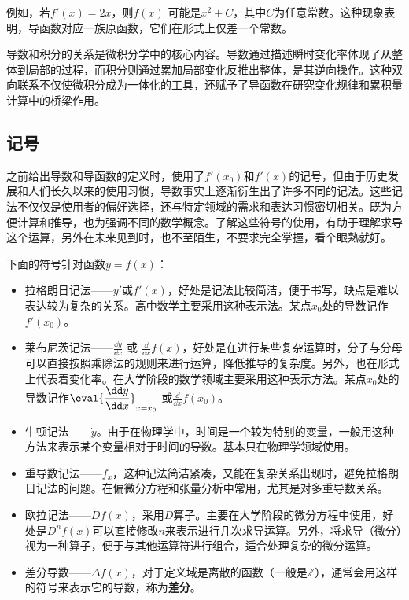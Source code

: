 例如，若$f'(x) = 2x$，则$f(x)$ 可能是$x^2 + C$，其中$C$为任意常数。这种现象表明，导函数对应一族原函数，它们在形式上仅差一个常数。

导数和积分的关系是微积分学中的核心内容。导数通过描述瞬时变化率体现了从整体到局部的过程，而积分则通过累加局部变化反推出整体，是其逆向操作。这种双向联系不仅使微积分成为一体化的工具，还赋予了导函数在研究变化规律和累积量计算中的桥梁作用。

\subsection{记号}

之前给出导数和导函数的定义时，使用了$f'(x_0)$和$f'(x)$的记号，但由于历史发展和人们长久以来的使用习惯，导数事实上逐渐衍生出了许多不同的记法。这些记法不仅仅是使用者的偏好选择，还与特定领域的需求和表达习惯密切相关。既为方便计算和推导，也为强调不同的数学概念。了解这些符号的使用，有助于理解求导这个运算，另外在未来见到时，也不至陌生，不要求完全掌握，看个眼熟就好。

下面的符号针对函数$y=f(x)$：
\begin{itemize}
\item 拉格朗日记法——$y'$或$f'(x)$，好处是记法比较简洁，便于书写，缺点是难以表达较为复杂的关系。高中数学主要采用这种表示法。某点$x_0$处的导数记作$f'(x_0)$。
\item 莱布尼茨记法——$\displaystyle\frac{\dd y}{\dd x}$  或  $\displaystyle\frac{\dd}{\dd x}f(x)$，好处是在进行某些复杂运算时，分子与分母可以直接按照乘除法的规则来进行运算，降低推导的复杂度。另外，也在形式上代表着变化率。在大学阶段的数学领域主要采用这种表示方法。某点$x_0$处的导数记作$\displaystyle\eval{\dfrac{\dd y}{\dd x}}_{x=x_0}$ 或$\displaystyle\frac{\dd}{\dd x}f(x_0)$。
\item 牛顿记法——$\dot{y}$。由于在物理学中，时间是一个较为特别的变量，一般用这种方法来表示某个变量相对于时间的导数。基本只在物理学领域使用。
\item 重导数记法——$f_x$，这种记法简洁紧凑，又能在复杂关系出现时，避免拉格朗日记法的问题。在偏微分方程和张量分析中常用，尤其是对多重导数关系。
\item 欧拉记法——$Df(x)$，采用$D$算子。主要在大学阶段的微分方程中使用，好处是$D^n f(x)$可以直接修改$n$来表示进行几次求导运算。另外，将求导（微分）视为一种算子，便于与其他运算符进行组合，适合处理复杂的微分运算。
\item 差分导数——$\Delta f(x)$，对于定义域是离散的函数（一般是$\mathbb{Z}$），通常会用这样的符号来表示它的导数，称为\textbf{差分}。
\end{itemize}


